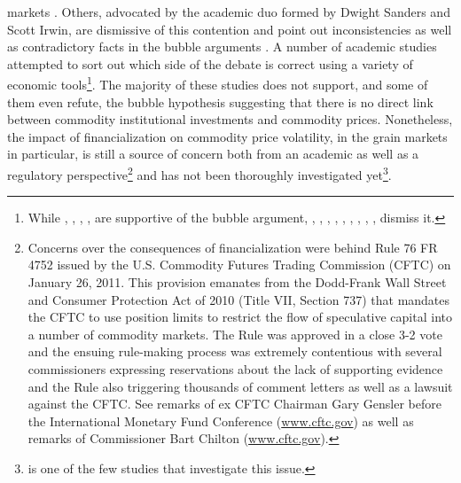 \documentclass[12pt,]{article}
\let\rmarkdownfootnote\footnote%
\def\footnote{\protect\rmarkdownfootnote}
\begin{document}
markets \citep[\citet{masters_accidental_2011},
\citet{caballero_financial_2008}, \citet{petzel_testimony_2009},
\citet{hamilton_causes_2009},
\citet{du_financial_2017}]{masters_testimony_2008}. Others, advocated by
the academic duo formed by Dwight Sanders and Scott Irwin, are
dismissive of this contention and point out inconsistencies as well as
contradictory facts in the bubble arguments
\citep[\citet{pirrong_restricting_2008}, \citet{pirrong_no_2010},
\citet{sanders_futures_2008}, \citet{irwin_devil_2009},
\citet{korniotis_does_2009}, \citet{harris_role_2009},
\citet{till_has_2009}, \citet{stoll_commodity_2010}]{krugman_more_2008}.
A number of academic studies attempted to sort out which side of the
debate is correct using a variety of economic tools\footnote{While
  \citet{gilbert_speculative_2010}, \citet{gilbert_how_2010},
  \citet{phillips_explosive_2011}, \citet{phillips_dating_2011},
  \citet{tang_index_2012} are supportive of the bubble argument,
  \citet{harris_role_2009}, \citet{brunetti_is_2009},
  \citet{sanders_adequacy_2010}, \citet{stoll_commodity_2010},
  \citet{sanders_speculative_2010}, \citet{sanders_adequacy_2010},
  \citet{sanders_impact_2011}, \citet{irwin_testing_2012},
  \citet{buyuksahin_speculators_2014}, \citet{kilian_role_2014} dismiss
  it.}. The majority of these studies does not support, and some of them
even refute, the bubble hypothesis suggesting that there is no direct
link between commodity institutional investments and commodity prices.
Nonetheless, the impact of financialization on commodity price
volatility, in the grain markets in particular, is still a source of
concern both from an academic as well as a regulatory
perspective\footnote{Concerns over the consequences of financialization
  were behind Rule 76 FR 4752 issued by the U.S. Commodity Futures
  Trading Commission (CFTC) on January 26, 2011. This provision emanates
  from the Dodd-Frank Wall Street and Consumer Protection Act of 2010
  (Title VII, Section 737) that mandates the CFTC to use position limits
  to restrict the flow of speculative capital into a number of commodity
  markets. The Rule was approved in a close 3-2 vote and the ensuing
  rule-making process was extremely contentious with several
  commissioners expressing reservations about the lack of supporting
  evidence and the Rule also triggering thousands of comment letters as
  well as a lawsuit against the CFTC. See remarks of ex CFTC Chairman
  Gary Gensler before the International Monetary Fund Conference
  (\href{http://www.cftc.gov/PressRoom/SpeechesTestimony/opagensler-137}{www.cftc.gov})
  as well as remarks of Commissioner Bart Chilton
  (\href{http://www.cftc.gov/PressRoom/SpeechesTestimony/chiltonstatement022412}{www.cftc.gov}).}
and has not been thoroughly investigated yet\footnote{\citet{bohl_does_2013}
  is one of the few studies that investigate this issue.}.
\end{document}
